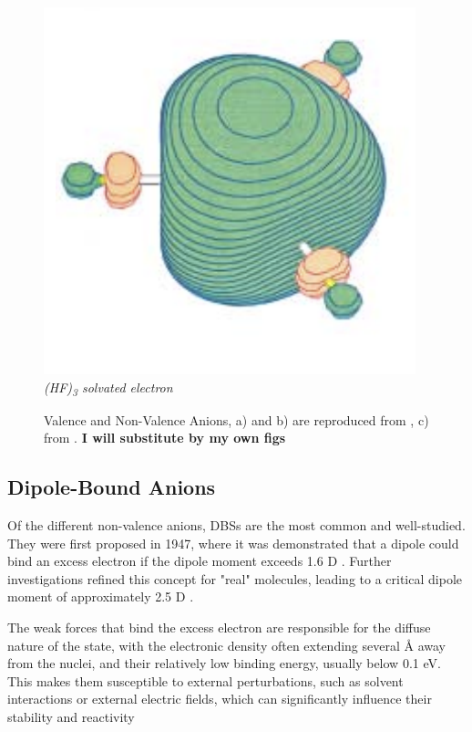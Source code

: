 \begin{figure}[h]
\begin{minipage}[b]{0.27\textwidth}
    \includegraphics[width=\textwidth]{chapters/introduction/image/hf3.png}
    \small\emph{(HF)\textsubscript{3} solvated electron}
  \end{minipage}
  \caption[Valence and Non-Valence Anions]{Valence and Non-Valence Anions, a) and b) are reproduced from \cite{dutta2015electron}, c) from \cite{jordan2003theory}. \textbf{I will substitute by my own figs}}
  \label{fig:AnionTypes}
\end{figure}

\subsection{Dipole-Bound Anions}
Of the different non-valence anions, DBSs are the most common and well-studied. They were first proposed in 1947, where it was demonstrated that a dipole could bind an excess electron if the dipole moment exceeds 1.6 D \cite{fermi1947capture}. Further investigations refined this concept for "real" molecules, leading to a critical dipole moment of approximately 2.5 D \cite{jordan2003theory}.

The weak forces that bind the excess electron are responsible for the diffuse nature of the state, with the electronic density often extending several Å away from the nuclei, and their relatively low binding energy, usually below 0.1 eV. This makes them susceptible to external perturbations, such as solvent interactions or external electric fields, which can significantly influence their stability and reactivity \cite{schiedt1998anion,hall2002two,jalbout2001dipole,gutowski2002solvated,skurski2002excess,jordan2003theory,eustis2007photoelectron,simons2008molecular,herbert2015quantum,clarke2025role}

